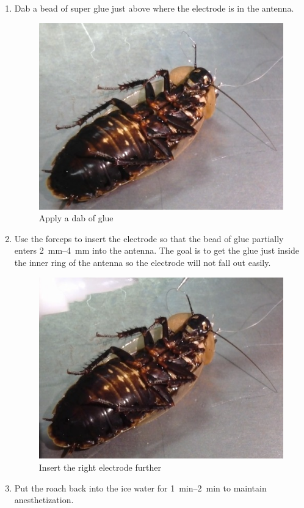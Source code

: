 \begin{enumerate}
\item Dab a bead of super glue just above where the electrode is in the antenna.
{\begin{figure}[ht!]
\centering
\includegraphics[scale=0.3]{Surgery Photos/relectrodeglue.jpg}
\caption{Apply a dab of glue}
\label{fig:relectrodeglue}
\end{figure}}

\item  Use the forceps to insert the electrode so that the bead of glue partially enters \SIrange{2}{4}{\milli\meter} into the antenna.
\subitem The goal is to get the glue just inside the inner ring of the antenna so the electrode will not fall out easily.
\begin{figure}[ht!]
\centering
\includegraphics[scale=0.3]{Surgery Photos/relectrode2.jpg}
\caption{Insert the right electrode further}
\label{fig:relectrode2}
\end{figure}

\item Put the roach back into the ice water for \SIrange{1}{2}{\minute} to maintain anesthetization.
\end{enumerate}






